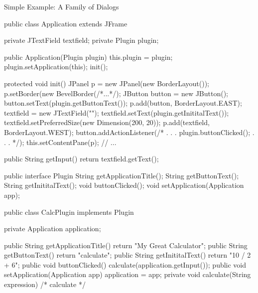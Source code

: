\begin{frame}[fragile]{Simple Example: A Family of Dialogs}
	\tiny\begin{mycolumns}[columns=2,widths={50,50}]
\begin{codetight}{}
public class Application extends JFrame {
	private JTextField textfield;
	private Plugin plugin;

	public Application(Plugin plugin) {
		this.plugin = plugin;
		plugin.setApplication(this);
		init();
	}

	protected void init() {
		JPanel p = new JPanel(new BorderLayout());
		p.setBorder(new BevelBorder(/*...*/);
		JButton button = new JButton();
		button.setText(plugin.getButtonText());
		p.add(button, BorderLayout.EAST);
		textfield = new JTextField("");
		textfield.setText(plugin.getInititalText());
		textfield.setPreferredSize(new Dimension(200, 20));
		p.add(textfield, BorderLayout.WEST);		
		button.addActionListener(/* . . . plugin.buttonClicked(); . . . */);
		this.setContentPane(p);
		// ...
	}

	public String getInput() {
		return textfield.getText();
	}
}
\end{codetight}
		\mynextcolumn
\begin{codetight}{}
public interface Plugin {
	String getApplicationTitle();
	String getButtonText();
	String getInititalText();
	void buttonClicked();
	void setApplication(Application app);
}
\end{codetight}
\begin{codetight}{}
public class CalcPlugin implements Plugin {
	private Application application;

	public String getApplicationTitle() {
		return "My Great Calculator";
	}
	public String getButtonText() {
		return "calculate";
	}
	public String getInititalText() {
		return "10 / 2 + 6";
	}
	public void buttonClicked() {
		calculate(application.getInput());
	}
	public void setApplication(Application app) {
		application = app;
	}
	private void calculate(String expression) {
		/* calculate */
	}
}
\end{codetight}
	\end{mycolumns}
\end{frame}

